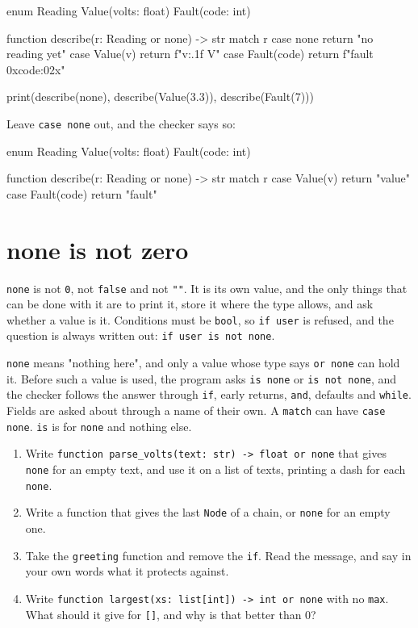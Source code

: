 \begin{zeno}
enum Reading {
    Value(volts: float)
    Fault(code: int)
}

function describe(r: Reading or none) -> str {
    match r {
        case none { return "no reading yet" }
        case Value(v) { return f"{v:.1f} V" }
        case Fault(code) { return f"fault 0x{code:02x}" }
    }
}

print(describe(none), describe(Value(3.3)), describe(Fault(7)))
\end{zeno}

Leave \verb|case none| out, and the checker says so:

\begin{zeno}[fails=yes]
enum Reading {
    Value(volts: float)
    Fault(code: int)
}

function describe(r: Reading or none) -> str {
    match r {
        case Value(v) { return "value" }
        case Fault(code) { return "fault" }
    }
}
\end{zeno}

\section{none is not zero}

\verb|none| is not \verb|0|, not \verb|false| and not \verb|""|. It is
its own value, and the only things that can be done with it are to
print it, store it where the type allows, and ask whether a value is
it. Conditions must be \verb|bool|, so \verb|if user| is refused, and
the question is always written out: \verb|if user is not none|.

\begin{summary}
\verb|none| means "nothing here", and only a value whose type says
\verb|or none| can hold it. Before such a value is used, the program
asks \verb|is none| or \verb|is not none|, and the checker follows the
answer through \verb|if|, early returns, \verb|and|, defaults and
\verb|while|. Fields are asked about through a name of their own. A
\verb|match| can have \verb|case none|. \verb|is| is for \verb|none|
and nothing else.
\end{summary}

\begin{tryit}
\begin{enumerate}
\item Write \verb|function parse_volts(text: str) -> float or none|
  that gives \verb|none| for an empty text, and use it on a list of
  texts, printing a dash for each \verb|none|.
\item Write a function that gives the last \verb|Node| of a chain, or
  \verb|none| for an empty one.
\item Take the \verb|greeting| function and remove the \verb|if|. Read
  the message, and say in your own words what it protects against.
\item Write \verb|function largest(xs: list[int]) -> int or none| with
  no \verb|max|. What should it give for \verb|[]|, and why is that
  better than 0?
\end{enumerate}
\end{tryit}
